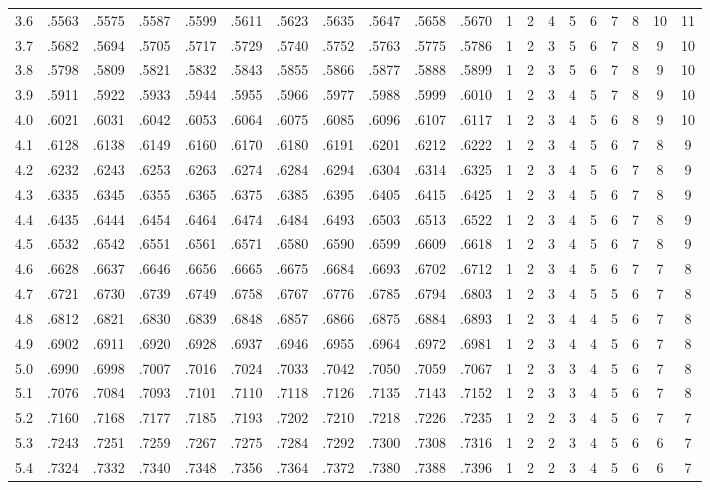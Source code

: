 {\begin{tabular}{|c|cccccccccc|ccccccccc|}
3.6 & .5563 & .5575 & .5587 & .5599 & .5611 & .5623 & .5635 & .5647 & .5658 & .5670 & 1 & 2 & 4 & 5 & 6 & 7 & 8 & 10 & 11 \\
3.7 & .5682 & .5694 & .5705 & .5717 & .5729 & .5740 & .5752 & .5763 & .5775 & .5786 & 1 & 2 & 3 & 5 & 6 & 7 & 8 & 9 & 10 \\
3.8 & .5798 & .5809 & .5821 & .5832 & .5843 & .5855 & .5866 & .5877 & .5888 & .5899 & 1 & 2 & 3 & 5 & 6 & 7 & 8 & 9 & 10 \\
3.9 & .5911 & .5922 & .5933 & .5944 & .5955 & .5966 & .5977 & .5988 & .5999 & .6010 & 1 & 2 & 3 & 4 & 5 & 7 & 8 & 9 & 10 \\
4.0 & .6021 & .6031 & .6042 & .6053 & .6064 & .6075 & .6085 & .6096 & .6107 & .6117 & 1 & 2 & 3 & 4 & 5 & 6 & 8 & 9 & 10 \\
4.1 & .6128 & .6138 & .6149 & .6160 & .6170 & .6180 & .6191 & .6201 & .6212 & .6222 & 1 & 2 & 3 & 4 & 5 & 6 & 7 & 8 & 9 \\
4.2 & .6232 & .6243 & .6253 & .6263 & .6274 & .6284 & .6294 & .6304 & .6314 & .6325 & 1 & 2 & 3 & 4 & 5 & 6 & 7 & 8 & 9 \\
4.3 & .6335 & .6345 & .6355 & .6365 & .6375 & .6385 & .6395 & .6405 & .6415 & .6425 & 1 & 2 & 3 & 4 & 5 & 6 & 7 & 8 & 9 \\
4.4 & .6435 & .6444 & .6454 & .6464 & .6474 & .6484 & .6493 & .6503 & .6513 & .6522 & 1 & 2 & 3 & 4 & 5 & 6 & 7 & 8 & 9 \\
4.5 & .6532 & .6542 & .6551 & .6561 & .6571 & .6580 & .6590 & .6599 & .6609 & .6618 & 1 & 2 & 3 & 4 & 5 & 6 & 7 & 8 & 9 \\
4.6 & .6628 & .6637 & .6646 & .6656 & .6665 & .6675 & .6684 & .6693 & .6702 & .6712 & 1 & 2 & 3 & 4 & 5 & 6 & 7 & 7 & 8 \\
4.7 & .6721 & .6730 & .6739 & .6749 & .6758 & .6767 & .6776 & .6785 & .6794 & .6803 & 1 & 2 & 3 & 4 & 5 & 5 & 6 & 7 & 8 \\
4.8 & .6812 & .6821 & .6830 & .6839 & .6848 & .6857 & .6866 & .6875 & .6884 & .6893 & 1 & 2 & 3 & 4 & 4 & 5 & 6 & 7 & 8 \\
4.9 & .6902 & .6911 & .6920 & .6928 & .6937 & .6946 & .6955 & .6964 & .6972 & .6981 & 1 & 2 & 3 & 4 & 4 & 5 & 6 & 7 & 8 \\
5.0 & .6990 & .6998 & .7007 & .7016 & .7024 & .7033 & .7042 & .7050 & .7059 & .7067 & 1 & 2 & 3 & 3 & 4 & 5 & 6 & 7 & 8 \\
5.1 & .7076 & .7084 & .7093 & .7101 & .7110 & .7118 & .7126 & .7135 & .7143 & .7152 & 1 & 2 & 3 & 3 & 4 & 5 & 6 & 7 & 8 \\
5.2 & .7160 & .7168 & .7177 & .7185 & .7193 & .7202 & .7210 & .7218 & .7226 & .7235 & 1 & 2 & 2 & 3 & 4 & 5 & 6 & 7 & 7 \\
5.3 & .7243 & .7251 & .7259 & .7267 & .7275 & .7284 & .7292 & .7300 & .7308 & .7316 & 1 & 2 & 2 & 3 & 4 & 5 & 6 & 6 & 7 \\
5.4 & .7324 & .7332 & .7340 & .7348 & .7356 & .7364 & .7372 & .7380 & .7388 & .7396 & 1 & 2 & 2 & 3 & 4 & 5 & 6 & 6 & 7 \\
\hline
\end{tabular}
\par}
\clearpage


